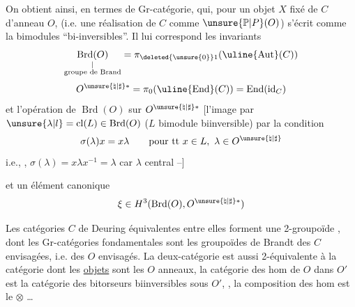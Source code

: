 On obtient ainsi, en termes de   Gr-catégorie, qui, pour un objet $X$ fixé de $C$ d'anneau $O$, (i.e. une réalisation de $C$ comme $\unsure{\mathbb P|P}(O)$) s'écrit comme la   bimodules ``bi-inversibles''. Il lui correspond les invariants
\[
\underset{\substack{|\\\text{groupe de Brand}}}{\operatorname{Brd}(O)}
=\pi_{\deleted{\unsure{0}}1}(\uline{\operatorname{Aut}}(C))
\]
\[
O^{\unsure{\natural|\sharp}*}=\pi_0(\uline{\operatorname{End}}(C))=\operatorname{End}(\operatorname{id}_C)
\]
et  l'opération  de $\operatorname{Brd}(O)$ sur $O^{\unsure{\natural|\sharp}*}$   [l'image \inserted{$\sigma(\lambda)$} par $\unsure{\lambda|l}=\operatorname{cl}(L)\in\operatorname{Brd}(O)$  ($L$ bimodule biinversible)   par la condition
\[
\sigma(\lambda)x=x\lambda\qquad\text{pour tt }x\in L,\ \lambda\in O^{\unsure{\natural|\sharp}}
\]
i.e., , $\sigma(\lambda)=x\lambda x^{-1}=\lambda$ car $\lambda$ central --]

et un élément canonique
\[
\xi\in H^3(\operatorname{Brd}(O),O^{\unsure{\natural|\sharp}*})
\]

Les catégories $C$ de Deuring équivalentes entre elles forment une  2-groupoïde , dont les  Gr-catégories fondamentales sont les groupoïdes de Brandt des $C$ envisagées, i.e. des $O$ envisagés. La deux-catégorie est aussi 2-équivalente à la catégorie   dont les \uline{objets} sont les $O$   anneaux,  la catégorie des hom de $O$ dans $O'$ est la catégorie des bitorseurs biinversibles sous $O'$, , la composition des hom est le $\otimes$ \ldots
{}
